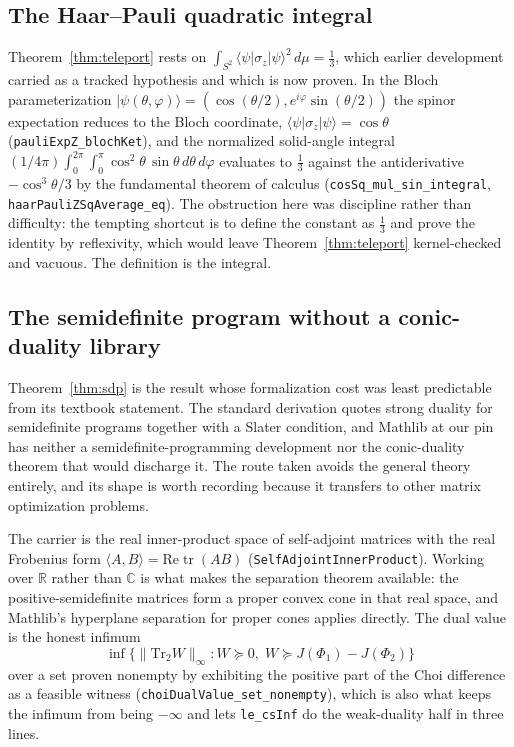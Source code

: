 \documentclass[aps,pra,reprint,nofootinbib,superscriptaddress]{revtex4-2}
\theoremstyle{plain}
\theoremstyle{definition}
\theoremstyle{remark}
\newcommand{\lean}[1]{\texttt{#1}}
\newcommand{\opnorm}[1]{\lVert #1 \rVert_{\infty}}
\begin{document}
\subsection{The Haar--Pauli quadratic integral}

Theorem~\ref{thm:teleport} rests on
$\int_{S^2}\langle\psi|\sigma_z|\psi\rangle^2\,d\mu = \tfrac13$, which
earlier development carried as a tracked hypothesis and which is now
proven. In the Bloch parameterization $|\psi(\theta,\varphi)\rangle =
(\cos(\theta/2), e^{i\varphi}\sin(\theta/2))$ the spinor expectation
reduces to the Bloch coordinate,
$\langle\psi|\sigma_z|\psi\rangle = \cos\theta$
(\lean{pauliExpZ\_blochKet}), and the normalized solid-angle integral
$(1/4\pi)\int_0^{2\pi}\!\!\int_0^{\pi}\cos^2\theta\,\sin\theta\,
d\theta\,d\varphi$ evaluates to $\tfrac13$ against the antiderivative
$-\cos^3\theta/3$ by the fundamental theorem of calculus
(\lean{cosSq\_mul\_sin\_integral}, \lean{haarPauliZSqAverage\_eq}). The
obstruction here was discipline rather than difficulty: the tempting
shortcut is to define the constant as $\tfrac13$ and prove the identity
by reflexivity, which would leave Theorem~\ref{thm:teleport}
kernel-checked and vacuous. The definition is the integral.

\subsection{The semidefinite program without a conic-duality library}
\label{sec:owned-sdp}

Theorem~\ref{thm:sdp} is the result whose formalization cost was least
predictable from its textbook statement. The standard derivation quotes
strong duality for semidefinite programs together with a Slater
condition, and Mathlib at our pin has neither a semidefinite-programming
development nor the conic-duality theorem that would discharge it. The
route taken avoids the general theory entirely, and its shape is worth
recording because it transfers to other matrix optimization problems.

The carrier is the real inner-product space of self-adjoint matrices with
the real Frobenius form
$\langle A,B\rangle = \mathrm{Re}\operatorname{tr}(AB)$
(\lean{SelfAdjointInnerProduct}). Working over $\mathbb{R}$ rather than
$\mathbb{C}$ is what makes the separation theorem available: the
positive-semidefinite matrices form a proper convex cone in that real
space, and Mathlib's hyperplane separation for proper cones applies
directly. The dual value is the honest infimum
\[
\inf\{\opnorm{\mathrm{Tr}_2 W} : W \succeq 0,\;
W \succeq J(\Phi_1)-J(\Phi_2)\}
\]
over a set proven nonempty by exhibiting the positive part of the Choi
difference as a feasible witness (\lean{choiDualValue\_set\_nonempty}),
which is also what keeps the infimum from being $-\infty$ and lets
\lean{le\_csInf} do the weak-duality half in three lines.
\end{document}
